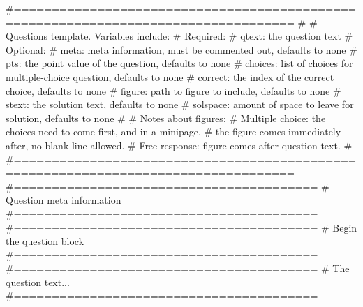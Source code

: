 \#{===================================================================================}
\#{                                                                                   }
\#{ Questions template. Variables include:                                            }
\#{   Required:                                                                       }
\#{     qtext:    the question text                                                   }
\#{   Optional:                                                                       }
\#{     meta:     meta information, must be commented out, defaults to none           }
\#{     pts:      the point value of the question, defaults to none                   }
\#{     choices:  list of choices for multiple-choice question, defaults to none      }
\#{     correct:  the index of the correct choice, defaults to none                   }
\#{     figure:   path to figure to include, defaults to none                         }
\#{     stext:    the solution text, defaults to none                                 }
\#{     solspace: amount of space to leave for solution, defaults to none             }
\#{                                                                                   }
\#{ Notes about figures:                                                              }
\#{   Multiple choice: the choices need to come first, and in a minipage.             }
\#{                    the figure comes immediately after, no blank line allowed.     }
\#{   Free response: figure comes after question text.                                }
\#{                                                                                   }
\#{===================================================================================}
\#{========================================}
\#{ Question meta information              }
\#{========================================}
\#{========================================}
\#{ Begin the question block               }
\#{========================================}
\question
{}
\#{========================================}
\#{ The question text...                   }
\#{========================================}

